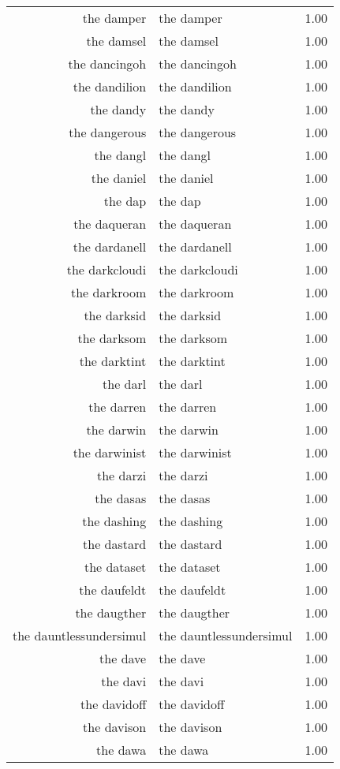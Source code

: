 \begin{table}[ht]
\begin{tabular}{rlr}
  the damper & the damper & 1.00 \\ 
  the damsel & the damsel & 1.00 \\ 
  the dancingoh & the dancingoh & 1.00 \\ 
  the dandilion & the dandilion & 1.00 \\ 
  the dandy & the dandy & 1.00 \\ 
  the dangerous & the dangerous & 1.00 \\ 
  the dangl & the dangl & 1.00 \\ 
  the daniel & the daniel & 1.00 \\ 
  the dap & the dap & 1.00 \\ 
  the daqueran & the daqueran & 1.00 \\ 
  the dardanell & the dardanell & 1.00 \\ 
  the darkcloudi & the darkcloudi & 1.00 \\ 
  the darkroom & the darkroom & 1.00 \\ 
  the darksid & the darksid & 1.00 \\ 
  the darksom & the darksom & 1.00 \\ 
  the darktint & the darktint & 1.00 \\ 
  the darl & the darl & 1.00 \\ 
  the darren & the darren & 1.00 \\ 
  the darwin & the darwin & 1.00 \\ 
  the darwinist & the darwinist & 1.00 \\ 
  the darzi & the darzi & 1.00 \\ 
  the dasas & the dasas & 1.00 \\ 
  the dashing & the dashing & 1.00 \\ 
  the dastard & the dastard & 1.00 \\ 
  the dataset & the dataset & 1.00 \\ 
  the daufeldt & the daufeldt & 1.00 \\ 
  the daugther & the daugther & 1.00 \\ 
  the dauntlessundersimul & the dauntlessundersimul & 1.00 \\ 
  the dave & the dave & 1.00 \\ 
  the davi & the davi & 1.00 \\ 
  the davidoff & the davidoff & 1.00 \\ 
  the davison & the davison & 1.00 \\ 
  the dawa & the dawa & 1.00 \\ 

\end{tabular}
\end{table}
